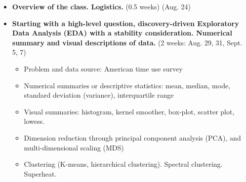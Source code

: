 \documentclass[11pt]{article}
\begin{document}
\begin{itemize}

\item 
\textbf{Overview of the class. Logistics.}
(0.5 weeks) (Aug. 24)

\item 
\textbf{Starting with a high-level question, discovery-driven Exploratory Data Analysis (EDA) with a stability consideration. Numerical summary and visual descriptions of data.}
(2 weeks: Aug. 29, 31, Sept. 5, 7) 
\begin{itemize}
\item
Problem and data source: American time use survey

\item
Numerical summaries or descriptive statistics: mean, median, mode, standard
deviation (variance), interquartile range

\item
Visual summaries: histogram, kernel smoother, box-plot, scatter plot, lowess. 

\item
Dimension reduction through principal component analysis (PCA), and multi-dimensional scaling (MDS)

\item
Clustering (K-means, hierarchical clustering). Spectral clustering. Superheat.


\end{itemize}


\end{itemize}
\end{document}
